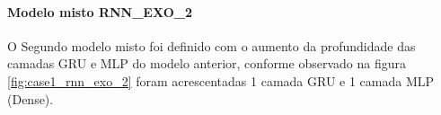         \paragraph{Modelo misto RNN\_EXO\_2}
         O Segundo modelo misto foi definido com o aumento da profundidade das camadas GRU e MLP do modelo anterior, conforme observado na figura \ref{fig:case1_rnn_exo_2} foram acrescentadas 1 camada GRU e 1 camada MLP (Dense).
            \begin{figure}[H]
            \end{figure}
        
